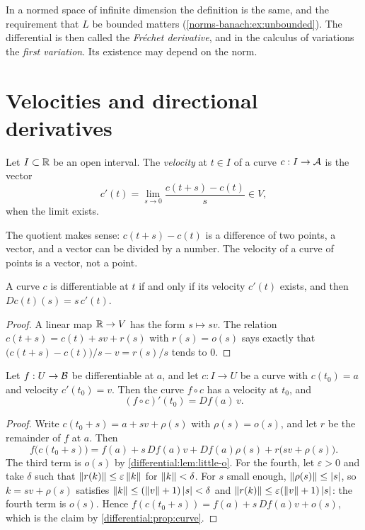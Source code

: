 \begin{notechapter}
\begin{remark}
In a normed space of infinite dimension the definition is the same, and
the requirement that $L$ be bounded matters
(\cref{norms-banach:ex:unbounded}). The differential is then called the
\emph{Fr\'echet derivative}, and in the calculus of variations the
\emph{first variation}. Its existence may depend on the norm.
\end{remark}

\section{Velocities and directional derivatives}
\label{differential:sec:velocity}

\begin{definition}[Velocity]\label{differential:def:velocity}
Let $I\subset\mathbb{R}$ be an open interval. The \emph{velocity} at $t\in I$ of a
curve $c:I\to\mathcal{A}$ is the vector
\[
  c'(t) = \lim_{s\to0}\frac{c(t + s) - c(t)}s \in V ,
\]
when the limit exists.
\end{definition}

The quotient makes sense: $c(t + s) - c(t)$ is a difference of two points,
a vector, and a vector can be divided by a number. The velocity of a curve
of points is a vector, not a point.

\begin{proposition}\label{differential:prop:curve}
A curve $c$ is differentiable at $t$ if and only if its velocity $c'(t)$
exists, and then $Dc(t)(s) = s\,c'(t)$.
\end{proposition}

\begin{proof}
A linear map $\mathbb{R}\to V$ has the form $s\mapsto sv$. The relation
$c(t + s) = c(t) + sv + r(s)$ with $r(s) = o(s)$ says exactly that
$\bigl(c(t + s) - c(t)\bigr)/s - v = r(s)/s$ tends to $0$.
\end{proof}

\begin{theorem}
\label{differential:thm:velocity}
Let $f:U\to\mathcal{B}$ be differentiable at $a$, and let $c:I\to U$ be a curve
with $c(t_0) = a$ and velocity $c'(t_0) = v$. Then the curve $f\circ c$
has a velocity at $t_0$, and
\[
  (f\circ c)'(t_0) = Df(a)\,v .
\]
\end{theorem}

\begin{proof}
Write $c(t_0 + s) = a + sv + \rho(s)$ with $\rho(s) = o(s)$, and let $r$
be the remainder of $f$ at $a$. Then
\[
  f\bigl(c(t_0 + s)\bigr)
  = f(a) + s\,Df(a)v + Df(a)\rho(s) + r\bigl(sv + \rho(s)\bigr) .
\]
The third term is $o(s)$ by \cref{differential:lem:little-o}. For the
fourth, let $\varepsilon > 0$ and take $\delta$ such that
$\left\|r(k)\right\|\leq\varepsilon\left\|k\right\|$ for $\left\|k\right\| < \delta$. For $s$ small
enough, $\left\|\rho(s)\right\|\leq\left|s\right|$, so
$k = sv + \rho(s)$ satisfies $\left\|k\right\|\leq(\left\|v\right\| + 1)\left|s\right| < \delta$ and
$\left\|r(k)\right\|\leq\varepsilon(\left\|v\right\| + 1)\left|s\right|$: the fourth term is
$o(s)$. Hence $f(c(t_0 + s)) = f(a) + s\,Df(a)v + o(s)$, which is the
claim by \cref{differential:prop:curve}.
\end{proof}


\end{notechapter}
